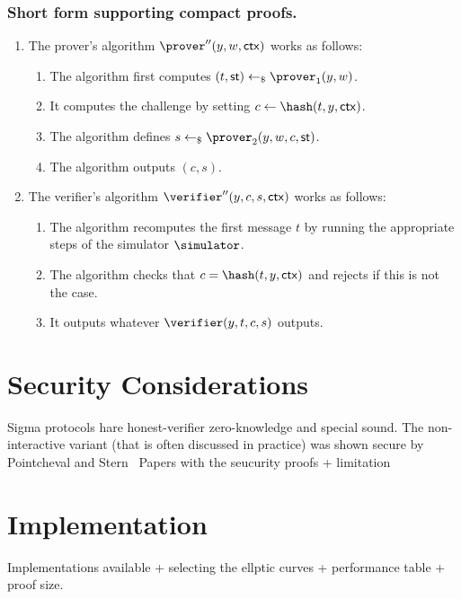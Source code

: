 \documentclass[runningheads]{llncs}
\begin{document}
\subsubsection{Short form supporting compact proofs.}
\begin{enumerate}
  \item
    The prover's algorithm $\prover''(y,w,\ctx)$ works as follows:
    \begin{enumerate}
      \item
        The algorithm first computes $(t,\st)\getsr\prover_1(y,w)$.
      \item
        It computes the challenge by setting $c\gets\hash(t,y,\ctx)$.
      \item
        The algorithm defines $s\getsr\prover_2(y,w,c,\st)$.
      \item
        The algorithm outputs $(c,s)$.
    \end{enumerate}
  \item
    The verifier's algorithm $\verifier''(y,c,s,\ctx)$ works as follows:
    \begin{enumerate}
      \item
        The algorithm recomputes the first message $t$ by running the appropriate steps of the simulator $\simulator$.
      \item
        The algorithm checks that $c=\hash(t,y,\ctx)$ and rejects if this is not the case.
      \item
        It outputs whatever $\verifier(y,t,c,s)$ outputs.
    \end{enumerate}
\end{enumerate}

\section{Security Considerations}
Sigma protocols hare honest-verifier zero-knowledge and special sound. The non-interactive variant (that is often discussed in practice) was shown secure by Pointcheval and Stern~\cite{JC:PoiSte00}
Papers with the seucurity proofs + limitation


\section{Implementation}
Implementations available + selecting the ellptic curves + performance table + proof size.
\end{document}
